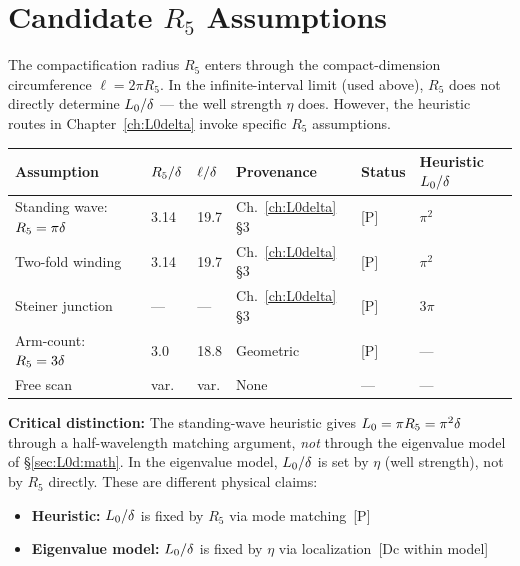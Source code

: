 \section{Candidate $R_5$ Assumptions}
\label{sec:L0d:R5}

The compactification radius $R_5$ enters through the compact-dimension
circumference $\ell = 2\pi R_5$. In the infinite-interval limit (used above),
$R_5$ does not directly determine $L_0/\delta$ --- the well strength $\eta$
does. However, the heuristic routes in Chapter~\ref{ch:L0delta} invoke specific
$R_5$ assumptions.

\begin{center}
\begin{tabular}{llllll}
\toprule
\textbf{Assumption} & $R_5/\delta$ & $\ell/\delta$ & \textbf{Provenance}
    & \textbf{Status} & \textbf{Heuristic $L_0/\delta$} \\
\midrule
Standing wave: $R_5 = \pi\delta$ & 3.14 & 19.7 & Ch.~\ref{ch:L0delta} §3
    & [P] & $\pi^2$ \\
Two-fold winding                  & 3.14 & 19.7 & Ch.~\ref{ch:L0delta} §3
    & [P] & $\pi^2$ \\
Steiner junction                  & —    & —    & Ch.~\ref{ch:L0delta} §3
    & [P] & $3\pi$ \\
Arm-count: $R_5 = 3\delta$       & 3.0  & 18.8 & Geometric
    & [P] & — \\
Free scan                         & var. & var. & None
    & —   & — \\
\bottomrule
\end{tabular}
\end{center}

\textbf{Critical distinction:} The standing-wave heuristic gives
$L_0 = \pi R_5 = \pi^2\delta$ through a half-wavelength matching argument,
\emph{not} through the eigenvalue model of \S\ref{sec:L0d:math}. In the eigenvalue
model, $L_0/\delta$ is set by $\eta$ (well strength), not by $R_5$ directly.
These are different physical claims:
\begin{itemize}
    \item \textbf{Heuristic:} $L_0/\delta$ is fixed by $R_5$ via mode matching~[P]
    \item \textbf{Eigenvalue model:} $L_0/\delta$ is fixed by $\eta$ via localization~[Dc within model]
\end{itemize}

